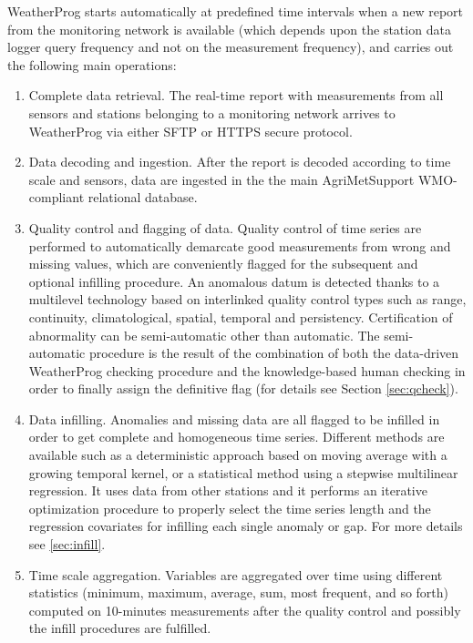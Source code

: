 \documentclass[authoryear,preprint,review,12pt]{elsarticle}
\begin{document}
WeatherProg starts automatically at predefined time intervals when a new report from the monitoring network is available (which depends upon the station data logger query frequency and not on the measurement frequency), and carries out the following main operations:
\begin{enumerate}
    \item Complete data retrieval. The real-time report with measurements from all sensors and stations belonging to a monitoring network arrives to WeatherProg via either SFTP or HTTPS secure protocol.
    
    \item Data decoding and ingestion. After the report is decoded according to time scale and sensors, data are ingested in the the main AgriMetSupport WMO-compliant relational database.

    \item Quality control and flagging of data. Quality control of time series are performed to automatically demarcate good measurements from wrong and missing values, which are conveniently flagged for the subsequent and optional infilling procedure.
    An anomalous datum is detected thanks to a multilevel technology based on interlinked quality control types such as range, continuity, climatological, spatial, temporal and persistency.
    Certification of abnormality can be semi-automatic other than automatic.
    The semi-automatic procedure is the result of the combination of both the data-driven WeatherProg checking procedure and the knowledge-based human checking in order to finally assign the definitive flag (for details see Section \ref{sec:qcheck}).
    
    \item Data infilling. Anomalies and missing data are all flagged to be %
    infilled in order to get complete and homogeneous time series.
    Different methods are available such as a deterministic approach based on moving average with a growing temporal kernel, or a statistical method using a stepwise multilinear regression.
    It uses data from other stations and it performs an iterative optimization procedure to properly select the time series length and the regression covariates for infilling each single anomaly or gap.
    For more details see \cref{sec:infill}.
    
    \item Time scale aggregation. Variables are aggregated over time using different statistics (minimum, maximum, average, sum, most frequent, and so forth) computed on 10-minutes measurements after the quality control and possibly the infill procedures are fulfilled.
    

\end{enumerate}
\end{document}
